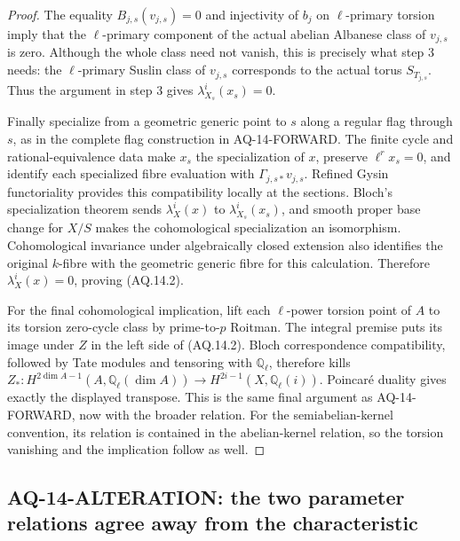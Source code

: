 \documentclass[11pt,a4paper]{article}
\theoremstyle{definition}\newtheorem{definition}[theorem]{Definition}
\theoremstyle{remark}\newtheorem{remark}[theorem]{Remark}
\begin{document}
\begin{proof}
The equality $B_{j,s}(v_{j,s})=0$ and injectivity of
$b_j$ on $\ell$-primary torsion imply that the
$\ell$-primary component of the actual abelian Albanese
class of $v_{j,s}$ is zero. Although the whole class
need not vanish, this is precisely what step 3 needs:
the $\ell$-primary Suslin class of $v_{j,s}$ corresponds
to the actual torus $S_{T_{j,s}}$. Thus the argument
in step 3 gives $\lambda_{X_s}^i(x_s)=0$.

Finally specialize from a geometric generic point to
$s$ along a regular flag through $s$, as in the complete
flag construction in AQ-14-FORWARD. The finite cycle
and rational-equivalence data make $x_s$ the
specialization of $x$, preserve $\ell^r x_s=0$, and
identify each specialized fibre evaluation with
$\Gamma_{j,s*}v_{j,s}$. Refined Gysin functoriality
provides this compatibility locally at the sections.
Bloch's specialization theorem sends
$\lambda_X^i(x)$ to $\lambda_{X_s}^i(x_s)$, and smooth
proper base change for $X/S$ makes the cohomological
specialization an isomorphism. Cohomological invariance
under algebraically closed extension also identifies
the original $k$-fibre with the geometric generic
fibre for this calculation. Therefore
$\lambda_X^i(x)=0$, proving (AQ.14.2).

For the final cohomological implication, lift each
$\ell$-power torsion point of $A$ to its torsion
zero-cycle class by prime-to-$p$ Roitman. The integral
premise puts its image under $Z$ in the left side of
(AQ.14.2). Bloch correspondence compatibility, followed
by Tate modules and tensoring with $\mathbb Q_\ell$,
therefore kills
$Z_*:H^{2\dim A-1}(A,\mathbb Q_\ell(\dim A))
\to H^{2i-1}(X,\mathbb Q_\ell(i))$.
Poincar\'e duality gives exactly the displayed transpose.
This is the same final argument as AQ-14-FORWARD, now
with the broader relation. For the semiabelian-kernel
convention, its relation is contained in the
abelian-kernel relation, so the torsion vanishing and
the implication follow as well.
\end{proof}

\subsection{AQ-14-ALTERATION: the two parameter relations agree away from the characteristic}
\end{document}
